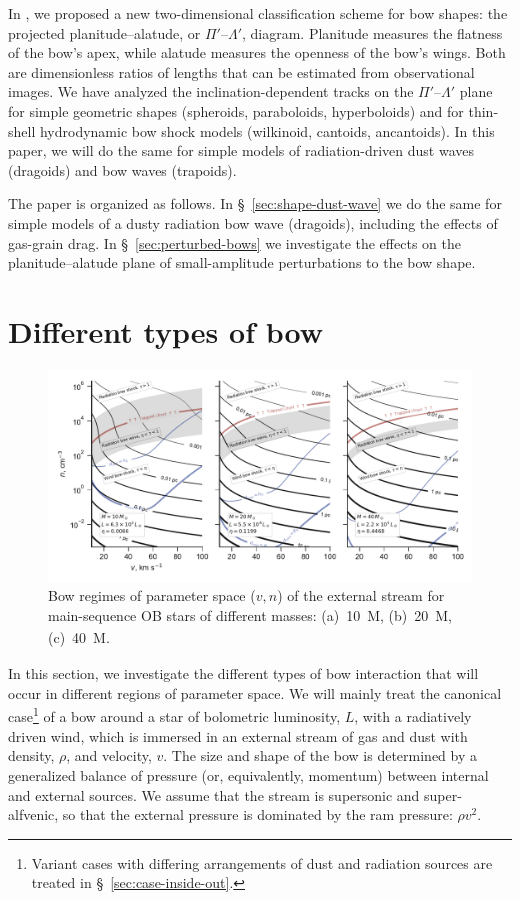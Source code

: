 In \citet[][hereafter \PaperI{}]{Tarango-Yong:2018a}, we proposed a
new two-dimensional classification scheme for bow shapes: the
projected planitude--alatude, or \(\Pi'\)--\(\Lambda'\), diagram.  Planitude
measures the flatness of the bow's apex, while alatude measures the
openness of the bow's wings.  Both are dimensionless ratios of lengths
that can be estimated from observational images.  We have analyzed the
inclination-dependent tracks on the \(\Pi'\)--\(\Lambda'\) plane for simple
geometric shapes (spheroids, paraboloids, hyperboloids) and for
thin-shell hydrodynamic bow shock models (wilkinoid, cantoids,
ancantoids).  In this paper, we will do the same for simple models of
radiation-driven dust waves (dragoids) and bow waves (trapoids).

The paper is organized as follows.
%
In \S~\ref{sec:shape-dust-wave} we do the same for simple models of a
dusty radiation bow wave (dragoids), including the effects of
gas-grain drag.
%
In \S~\ref{sec:perturbed-bows} we investigate the effects on the
planitude--alatude plane of small-amplitude perturbations to the bow
shape.
%


\section{Different types of bow}
\label{sec:different-types-bow}

\begin{figure}
  \includegraphics[width=\linewidth]{figs/zones-v-n-plane}
  \caption{Bow regimes of parameter space (\(v, n\)) of the external
    stream for main-sequence OB stars of different masses:
    (a)~\SI{10}{M_\odot}, (b)~\SI{20}{M_\odot}, (c)~\SI{40}{M_\odot}. }
  \label{fig:zones-v-n-plane}
\end{figure}

In this section, we investigate the different types of bow interaction
that will occur in different regions of parameter space. We will
mainly treat the canonical case\footnote{%
  Variant cases with differing arrangements of dust and radiation
  sources are treated in \S~\ref{sec:case-inside-out}.} %
of a bow around a star of bolometric luminosity, \(L\), with a
radiatively driven wind, which is immersed in an external stream of
gas and dust with density, \(\rho\), and velocity, \(v\).  The size and
shape of the bow is determined by a generalized balance of pressure
(or, equivalently, momentum) between internal and external sources.
We assume that the stream is supersonic and super-alfvenic, so that
the external pressure is dominated by the ram pressure: \(\rho v^2\).

